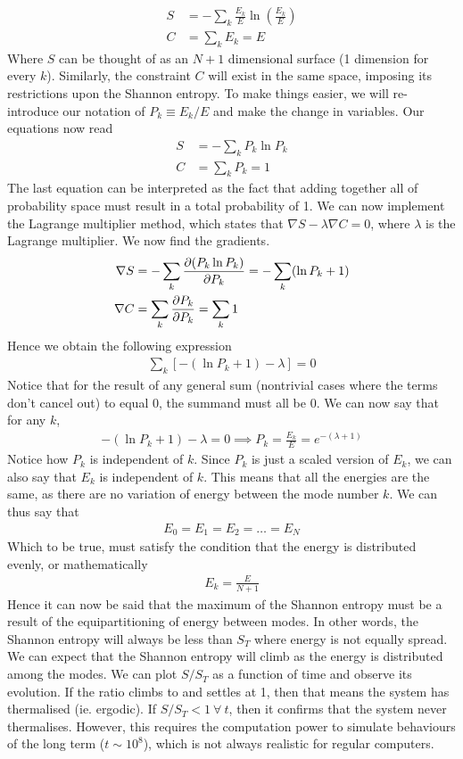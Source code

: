 \documentclass{article}
\begin{document}
\begin{align}
    S&=-\sum_k\frac{E_k}{E}\ln(\frac{E_k}{E})\\ 
    C&=\sum_kE_k=E
\end{align}
Where $S$ can be thought of as an $N+1$ dimensional surface (1 dimension for every $k$). 
Similarly, the constraint $C$ will exist in the same space, imposing 
its restrictions upon the Shannon entropy. 
To make things easier, we will re-introduce our notation of 
$P_k\equiv E_k/E$ and make the change in variables. Our equations now read 
\begin{align}
    S&=-\sum_kP_k\ln{P_k}\\
    C&=\sum_kP_k=1
\end{align}
The last equation can be interpreted as the fact that
 adding together all of probability space must result in a total probability of 1. 
We can now implement the Lagrange multiplier method, which states that $\nabla S-\lambda\nabla C=0$, 
where $\lambda$ is the Lagrange multiplier. We now find the gradients. 
\begin{align}
    \nabla S&=-\sum_k\pdv{(P_k\ln P_k)}{P_k}=-\sum_k(\ln P_k+1)\\ 
    \nabla C& =\sum_k\pdv{P_k}{P_k}=\sum_k1
\end{align}
Hence we obtain the following expression 
\begin{align}
    \sum_k[-(\ln P_k+1)-\lambda]=0
\end{align}
Notice that for the result of any general sum (nontrivial cases where the terms don't cancel out)
 to equal 0, the summand must all be 0. We can now say that for any $k$, 
\begin{align}
    -(\ln P_k+1)-\lambda=0\implies P_k=\frac{E_k}{E}=e^{-(\lambda+1)}
\end{align}
Notice how $P_k$ is independent of $k$. Since $P_k$ is just a scaled version of $E_k$, we can 
also say that $E_k$ is independent of $k$. This means that all the energies are the same, 
as there are no variation of energy between the mode number $k$. We can thus say that 
\begin{align}
    E_0=E_1=E_2=\dots=E_N
\end{align}
Which to be true, must satisfy the condition that the energy is distributed evenly, or mathematically 
\begin{align}
    E_k=\frac{E}{N+1}
\end{align}
Hence it can now be said that the maximum of the Shannon entropy must be a result of 
the equipartitioning of energy between modes. In other words, the Shannon entropy will always be less than $S_T$ where 
energy is not equally spread.  We can expect that the Shannon entropy will climb as the energy is distributed among the modes. 
We can plot $S/S_T$ as a function of time and observe its evolution. If the ratio climbs to and settles at 
1, then that means the system has thermalised (ie. ergodic). If $S/S_T<1\ \forall \ t$, then it confirms that the system never 
thermalises. However, this requires the computation power to simulate behaviours of the long term ($t\sim10^8$), 
which is not always realistic for regular computers.
\newpage 
\end{document}
